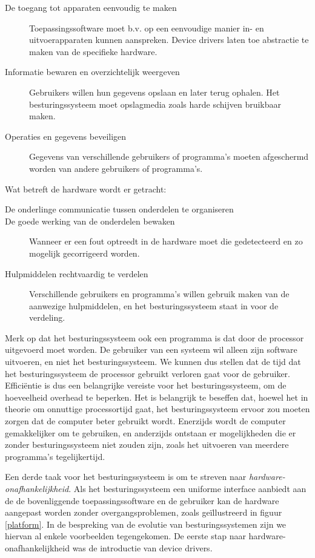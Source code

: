 \begin{description}
\item[De toegang tot apparaten eenvoudig te maken]Toepassingssoftware moet b.v.
op een eenvoudige manier in- en uitvoerapparaten kunnen aanspreken. Device
drivers laten toe abstractie te maken van de specifieke hardware.
\item[Informatie bewaren en overzichtelijk weergeven]Gebruikers willen hun
gegevens opslaan en later terug ophalen. Het besturingssysteem moet opslagmedia
zoals harde schijven bruikbaar maken.
\item[Operaties en gegevens beveiligen]Gegevens van verschillende gebruikers of
programma's moeten afgeschermd worden van andere gebruikers of programma's.
\end{description}

Wat betreft de hardware wordt er getracht:

\begin{description}
\item[De onderlinge communicatie tussen onderdelen te organiseren]
\item[De goede werking van de onderdelen bewaken]Wanneer er een fout optreedt in
de hardware moet die gedetecteerd en zo mogelijk gecorrigeerd worden.
\item[Hulpmiddelen rechtvaardig te verdelen]Verschillende gebruikers en
programma's willen gebruik maken van de aanwezige hulpmiddelen, en het
besturingssysteem staat in voor de verdeling.
\end{description}

Merk op dat het besturingssysteem ook een programma is dat door de
processor uitgevoerd moet worden. De gebruiker van een systeem wil
alleen zijn software uitvoeren, en niet het besturingssysteem. We kunnen
dus stellen dat de tijd dat het besturingssysteem de processor gebruikt
verloren gaat voor de gebruiker. Effici\"entie is dus een belangrijke
vereiste voor het besturingssysteem, om de hoeveelheid overhead te
beperken. Het is belangrijk te beseffen dat, hoewel het in theorie om
onnuttige processortijd gaat, het besturingssysteem ervoor zou moeten
zorgen dat de computer beter gebruikt wordt. Enerzijds wordt de computer
gemakkelijker om te gebruiken, en anderzijds ontstaan er mogelijkheden
die er zonder besturingssysteem niet zouden zijn, zoals het uitvoeren
van meerdere programma's tegelijkertijd.

Een derde taak voor het besturingssysteem is om te streven naar
\emph{hardware-onafhankelijkheid}. Als het
besturingssysteem een uniforme interface aanbiedt aan de de
bovenliggende toepassingssoftware en de gebruiker kan de hardware
aangepast worden zonder overgangsproblemen, zoals ge\"illustreerd in
figuur \ref{platform}. In de bespreking van de evolutie van
besturingssystemen zijn we hiervan al enkele voorbeelden tegengekomen.
De eerste stap naar hardware-onafhankelijkheid was de introductie
van device drivers.

